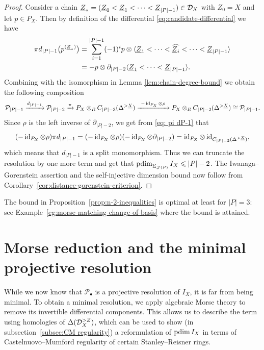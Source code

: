 \documentclass[a4paper,leqno]{amsart}
\begin{document}
\begin{proof}
Consider a chain $\underline{Z}_\ast=(\underline Z_0<\underline Z_1<\cdots<\underline Z_{|P|-1})\in \mathcal D_X$ with $Z_0=X$ and let $p\in P_X$. 
Then by definition of the differential \eqref{eq:candidate-differential} we have
\begin{align}
\pi d_{|P|-1}
\bigl(p^{(\underline{Z}_\ast)}\bigr)
&=
\sum_{i=1}^{|P|-1}(-1)^i p\otimes
\langle\underline Z_1<\cdots<\widehat{\underline Z_i}
<\cdots<\underline Z_{|P|-1}\rangle\notag
\\
&=-p\otimes\partial_{|P|-2}
\langle\underline Z_1<\cdots<\underline Z_{|P|-1}\rangle. \label{eq: pi dP-1}
\end{align}
Combining with the isomorphism in Lemma \ref{lem:chain-degree-bound} we obtain the following composition
\[ \mathcal P_{|P|-1} \xrightarrow{d_{|P|-1}} \mathcal P_{|P|-2}
\xrightarrow{\pi}
P_X\otimes_R C_{|P|-3}(\Delta^{>\underline X})\xrightarrow{\ -\id_{P_X}\otimes\rho\ }
P_X\otimes_R C_{|P|-2}(\Delta^{>\underline X})\cong \mathcal P_{|P|-1}.
\]
Since $\rho$ is the left inverse of $\partial_{|P|-2}$, we get from \eqref{eq: pi dP-1} that
\[
(-\operatorname{id}_{P_X}\otimes\rho)\pi d_{|P|-1} = 
(-\operatorname{id}_{P_X}\otimes\rho) (-\operatorname{id}_{P_X}\otimes\partial_{|P|-2}) = \operatorname{id}_{P_X}\otimes \operatorname{id}_{C_{|P|-2}(\Delta^{>\underline X})},
\]
which means that $d_{|P|-1}$ is a split monomorphism. Thus we can truncate the resolution by one more term and get that
$\operatorname{pdim}_{\Sigma_{\mathcal J(P)}}I_X\leqslant|P|-2$.
The Iwanaga--Gorenstein assertion and the self-injective dimension bound now follow from Corollary~\ref{cor:distance-gorenstein-criterion}.
\end{proof}

\begin{rmk}
The bound in Proposition~\ref{prop:n-2-inequalities} is optimal at least for $|P|=3$: see Example~\ref{eg:morse-matching-change-of-basis} where the bound is attained.
\end{rmk}

\section{Morse reduction and the minimal projective resolution}
\label{sec:minimal-morse}

While we now know that ${\mathcal P}_\bullet$ is a projective resolution of $I_X$, it is far from being minimal.  To obtain a minimal resolution, we apply algebraic Morse theory \cite{CLZ26} to remove its invertible differential components. 
This allows us to describe the term using homologies of $\Delta(\mathcal D_X^{>Z})$, which can be used to show (in subsection~\ref{subsec:CM regularity}) a reformulation of $\operatorname{pdim} I_X$ in terms of Castelnuovo--Mumford regularity of certain Stanley--Reisner rings.
\end{document}
